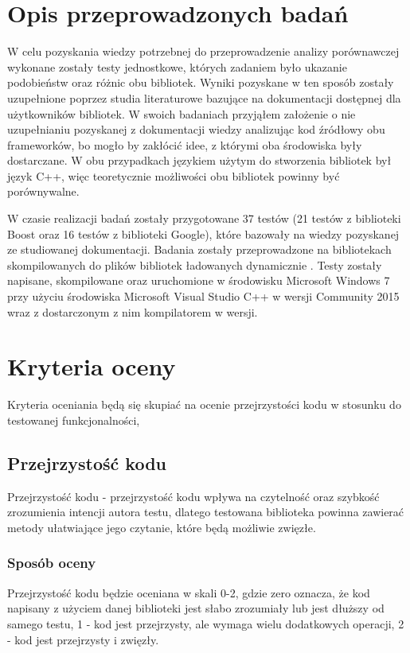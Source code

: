 \documentclass[12pt,a4paper,notitlepage]{report}
\begin{document}
\chapter{Opis przeprowadzonych badań}

W celu pozyskania wiedzy potrzebnej do przeprowadzenie analizy porównawczej wykonane zostały testy jednostkowe, których zadaniem było ukazanie podobieństw oraz różnic obu bibliotek. Wyniki pozyskane w ten sposób zostały uzupełnione poprzez studia literaturowe bazujące na dokumentacji dostępnej dla użytkowników bibliotek.
W swoich badaniach przyjąłem założenie o nie uzupełnianiu pozyskanej z dokumentacji wiedzy analizując kod źródłowy obu frameworków, bo mogło by zakłócić idee, z którymi oba środowiska były dostarczane. W obu przypadkach językiem użytym do stworzenia bibliotek był język C++, więc teoretycznie możliwości obu bibliotek powinny być porównywalne.

W czasie realizacji badań zostały przygotowane 37 testów (21 testów z biblioteki Boost oraz 16 testów z biblioteki Google), które bazowały na wiedzy pozyskanej ze studiowanej dokumentacji.
Badania zostały przeprowadzone na bibliotekach skompilowanych do plików bibliotek ładowanych dynamicznie \cite{DLL}. Testy zostały napisane, skompilowane oraz uruchomione w środowisku Microsoft Windows 7 przy użyciu środowiska Microsoft Visual Studio C++ w wersji Community 2015 wraz z dostarczonym z nim kompilatorem w wersji.

\chapter{Kryteria oceny}

Kryteria oceniania będą się skupiać na ocenie przejrzystości kodu w stosunku do testowanej funkcjonalności,

\section{Przejrzystość kodu}

Przejrzystość kodu - przejrzystość kodu wpływa na czytelność oraz szybkość zrozumienia intencji autora testu, dlatego testowana biblioteka powinna zawierać metody ułatwiające jego czytanie, które będą możliwie zwięzłe.

\subsection{Sposób oceny}
Przejrzystość kodu będzie oceniana w skali 0-2, gdzie zero oznacza, że kod napisany z użyciem danej biblioteki jest słabo zrozumiały lub jest dłuższy od samego testu, 1 - kod jest przejrzysty, ale wymaga wielu dodatkowych operacji, 2 - kod jest przejrzysty i zwięzły.
\end{document}
